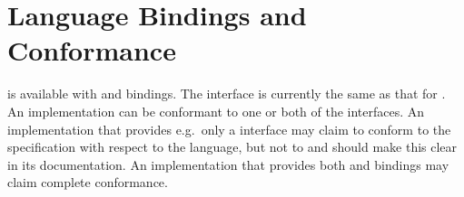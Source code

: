 \section{Language Bindings and Conformance}

\openshmem is available with \Clang{} and \Fortran{} bindings.  The \Cpp{}
interface is currently the same as that for \Clang.  An \openshmem implementation can be conformant to one or both of the
interfaces.  An implementation that provides e.g.\ only a \Clang{} interface may claim to conform to the \openshmem specification with respect to
the \Clang{} language, but not to \Fortran{} and should make this clear in its documentation.  An implementation that provides both \Clang{} and \Fortran{} bindings may claim
complete conformance.
